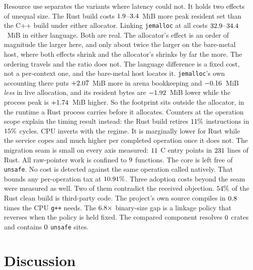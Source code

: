\documentclass[english,twoside,openright,a4paper,censored,csm,software-track-2020]{HYthesisML}
\begin{document}
Resource use separates the variants where latency could not. It holds two effects of
unequal size. The Rust build costs $1.9$--$3.4$~MiB more peak
resident set than the C++ build under either allocator. Linking \texttt{jemalloc} at all
costs $32.9$--$34.4$~MiB in either language. Both are real. The
allocator's effect is an order of magnitude the larger here, and only about twice the
larger on the bare-metal host, where both effects shrink and the allocator's shrinks by far
the more. The ordering travels and the ratio does not. The language difference is a
fixed cost, not a per-context one, and the bare-metal host locates it. \texttt{jemalloc}'s own
accounting there puts $+2.07$~MiB more in arena bookkeeping and
$-0.16$~MiB \emph{less} in live allocation, and its resident bytes are
$-1.92$~MiB lower while the process peak is $+1.74$~MiB higher. So the
footprint sits outside the allocator, in the runtime a Rust process carries before it
allocates. Counters at the operation scope explain the timing result instead: the Rust build
retires $11\%$ \BmInstrDeltaDir{} instructions in $15\%$
\BmCycleDeltaDir{} cycles. CPU inverts with the regime. It is marginally lower
for Rust while the service copes and much higher per completed operation once it does
not. The migration seam is small on every axis measured: $11$ C entry
points in $231$ lines of Rust. All raw-pointer work is confined to
$9$ functions. The core is left free of \texttt{unsafe}. No cost is detected
against the same operation called natively. That bounds any per-operation tax at
$10.91\%$. Three adoption costs beyond the seam were measured as well. Two of
them contradict the received objection. $54\%$ of the Rust
clean build is third-party code. The project's own source compiles in
$0.8$ times the CPU \texttt{g++} needs. The
$6.8\times$ binary-size gap is a linkage policy that reverses when the
policy is held fixed. The compared component resolves $0$ crates and contains
$0$ \texttt{unsafe} sites.

\chapter{Discussion\label{chapter:discussion}}
\end{document}
